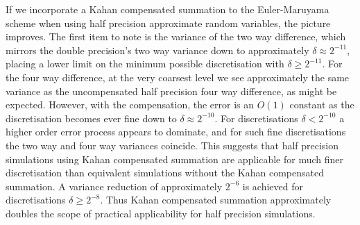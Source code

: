 \documentclass[9pt,a4paper,english]{extarticle}
\begin{document}
If we incorporate a Kahan compensated summation to the Euler-Maruyama scheme when using half precision approximate random variables, the picture improves. The first item to note is the variance of the two way difference, which mirrors the double precision's two way variance down to approximately $ \delta \approx  2^{-11} $, placing a lower limit on the minimum possible discretisation with $ \delta \geq 2^{-11} $. For the four way difference, at the very coarsest level we see approximately the same variance as the uncompensated half precision four way difference, as might be expected. However, with the compensation, the error is an $ O(1) $ constant as the discretisation becomes ever fine down to $ \delta \approx 2^{-10} $. For discretisations $ \delta <  2^{-10} $ a higher order error process appears to dominate, and for such fine discretisations the two way and four way variances coincide. This suggests that half precision simulations using Kahan compensated summation are applicable for much finer discretisation than equivalent simulations without the Kahan compensated summation. A variance reduction of approximately $ 2^{-6} $ is achieved for discretisations $ \delta \geq 2^{-8} $. Thus Kahan compensated summation approximately doubles the scope of practical applicability for half precision simulations. 

\begin{table}[htb]
\centering
\caption{Performance of various approximations and implementations of the inverse Gaussian cumulative distribution function, and the possible speed ups offered.}
\label{tab:implementations}

\hfil 
{}\hfil \hfil 
{}\hfil 
\end{table}
\end{document}

